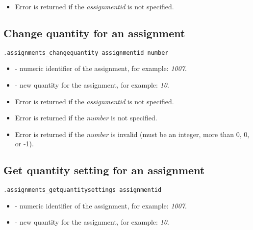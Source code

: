 \errheader
\begin{itemize}
    \item Error  is returned if the \textit{assignmentid} is not specified.
\end{itemize}



\subsection{Change quantity for an assignment}

\begin{lstlisting}[style=CommandLineStyle]
.assignments_changequantity assignmentid number
\end{lstlisting}

\paramsheader
\begin{itemize}
    \item {} - numeric identifier of the assignment, for example: \textit{1007}.
    \item {} - new quantity for the assignment, for example: \textit{10}.
\end{itemize}

\errheader
\begin{itemize}
    \item Error  is returned if the \textit{assignmentid} is not specified.
    \item Error  is returned if the \textit{number} is not specified.
    \item Error  is returned if the \textit{number} is invalid (must be an integer, more than 0, 0, or -1).
\end{itemize}


\subsection{Get quantity setting for an assignment}

\begin{lstlisting}[style=CommandLineStyle]
.assignments_getquantitysettings assignmentid
\end{lstlisting}

\paramsheader
\begin{itemize}
    \item {} - numeric identifier of the assignment, for example: \textit{1007}.
    \item {} - new quantity for the assignment, for example: \textit{10}.
\end{itemize}

